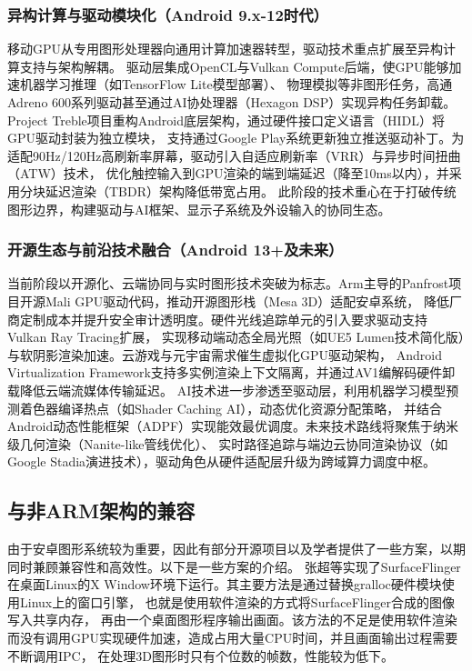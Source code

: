 \subsubsection{异构计算与驱动模块化（Android 9.x-12时代）​}

移动GPU从专用图形处理器向通用计算加速器转型，驱动技术重点扩展至异构计算支持与架构解耦。
驱动层集成OpenCL与Vulkan Compute后端，使GPU能够加速机器学习推理（如TensorFlow Lite模型部署\cite{tflite_gpu}）、
物理模拟等非图形任务，高通Adreno 600系列驱动甚至通过AI协处理器（Hexagon DSP）实现异构任务卸载。
Project Treble项目重构Android底层架构\cite{treble}，通过硬件接口定义语言（HIDL）将GPU驱动封装为独立模块\cite{hidl}，
支持通过Google Play系统更新独立推送驱动补丁。为适配90Hz/120Hz高刷新率屏幕，驱动引入自适应刷新率（VRR）与异步时间扭曲（ATW）技术，
优化触控输入到GPU渲染的端到端延迟（降至10ms以内），并采用分块延迟渲染（TBDR）架构降低带宽占用。
此阶段的技术重心在于打破传统图形边界，构建驱动与AI框架、显示子系统及外设输入的协同生态。

\subsubsection{开源生态与前沿技术融合（Android 13+及未来）​​}

当前阶段以开源化、云端协同与实时图形技术突破为标志。Arm主导的Panfrost项目\cite{panfrost}开源Mali GPU驱动代码，推动开源图形栈（Mesa 3D）适配安卓系统\cite{mesa}，
降低厂商定制成本并提升安全审计透明度\cite{panfrost}。硬件光线追踪单元的引入要求驱动支持Vulkan Ray Tracing扩展\cite{vulkan_raytracing}，
实现移动端动态全局光照（如UE5 Lumen技术简化版）与软阴影渲染加速。云游戏与元宇宙需求催生虚拟化GPU驱动架构，
Android Virtualization Framework支持多实例渲染上下文隔离，并通过AV1编解码硬件卸载降低云端流媒体传输延迟\cite{avf}。
AI技术进一步渗透至驱动层，利用机器学习模型预测着色器编译热点（如Shader Caching AI），动态优化资源分配策略，
并结合Android动态性能框架（ADPF）实现能效最优调度。未来技术路线将聚焦于纳米级几何渲染（Nanite-like管线优化）、
实时路径追踪与端边云协同渲染协议（如Google Stadia演进技术），驱动角色从硬件适配层升级为跨域算力调度中枢。

\subsection{与非ARM架构的兼容}
由于安卓图形系统较为重要，因此有部分开源项目以及学者提供了一些方案，以期同时兼顾兼容性和高效性。以下是一些方案的介绍。
张超等实现了SurfaceFlinger在桌面Linux的X Window环境下运行。其主要方法是通过替换gralloc硬件模块使用Linux上的窗口引擎，
也就是使用软件渲染的方式将SurfaceFlinger合成的图像写入共享内存，
再由一个桌面图形程序输出画面。该方法的不足是使用软件渲染而没有调用GPU实现硬件加速，造成占用大量CPU时间，并且画面输出过程需要不断调用IPC，
在处理3D图形时只有个位数的帧数，性能较为低下\cite{张超2012Android}。

